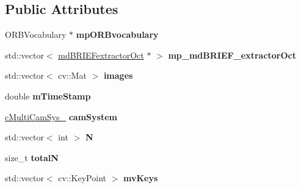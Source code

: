 \subsection*{Public Attributes}
\begin{DoxyCompactItemize}
\item 
O\+R\+B\+Vocabulary $\ast$ {\bfseries mp\+O\+R\+Bvocabulary}\hypertarget{classMultiColSLAM_1_1cMultiFrame_ac5c8d432c45ee464be9bccefb0dca5cc}{}\label{classMultiColSLAM_1_1cMultiFrame_ac5c8d432c45ee464be9bccefb0dca5cc}

\item 
std\+::vector$<$ \hyperlink{classMultiColSLAM_1_1mdBRIEFextractorOct}{md\+B\+R\+I\+E\+Fextractor\+Oct} $\ast$ $>$ {\bfseries mp\+\_\+md\+B\+R\+I\+E\+F\+\_\+extractor\+Oct}\hypertarget{classMultiColSLAM_1_1cMultiFrame_a2c46aafe197d7fb31e0b6156dae174bc}{}\label{classMultiColSLAM_1_1cMultiFrame_a2c46aafe197d7fb31e0b6156dae174bc}

\item 
std\+::vector$<$ cv\+::\+Mat $>$ {\bfseries images}\hypertarget{classMultiColSLAM_1_1cMultiFrame_a69a65d29d42e95b76de8bec74fcbd9f7}{}\label{classMultiColSLAM_1_1cMultiFrame_a69a65d29d42e95b76de8bec74fcbd9f7}

\item 
double {\bfseries m\+Time\+Stamp}\hypertarget{classMultiColSLAM_1_1cMultiFrame_a8ed84dc9027c7e2c6656aa38783346f2}{}\label{classMultiColSLAM_1_1cMultiFrame_a8ed84dc9027c7e2c6656aa38783346f2}

\item 
\hyperlink{classMultiColSLAM_1_1cMultiCamSys__}{c\+Multi\+Cam\+Sys\+\_\+} {\bfseries cam\+System}\hypertarget{classMultiColSLAM_1_1cMultiFrame_a8a008b755201a3b9f558138edd7fb4e9}{}\label{classMultiColSLAM_1_1cMultiFrame_a8a008b755201a3b9f558138edd7fb4e9}

\item 
std\+::vector$<$ int $>$ {\bfseries N}\hypertarget{classMultiColSLAM_1_1cMultiFrame_ac9af706463d890b82fbf9ab09c0af0ca}{}\label{classMultiColSLAM_1_1cMultiFrame_ac9af706463d890b82fbf9ab09c0af0ca}

\item 
size\+\_\+t {\bfseries totalN}\hypertarget{classMultiColSLAM_1_1cMultiFrame_adcdde7766f469bab2916615cc1b9d7ec}{}\label{classMultiColSLAM_1_1cMultiFrame_adcdde7766f469bab2916615cc1b9d7ec}

\item 
std\+::vector$<$ cv\+::\+Key\+Point $>$ {\bfseries mv\+Keys}\hypertarget{classMultiColSLAM_1_1cMultiFrame_a6c8f3364dd006dd897a842bfd0d87d76}{}\label{classMultiColSLAM_1_1cMultiFrame_a6c8f3364dd006dd897a842bfd0d87d76}


\end{DoxyCompactItemize}
